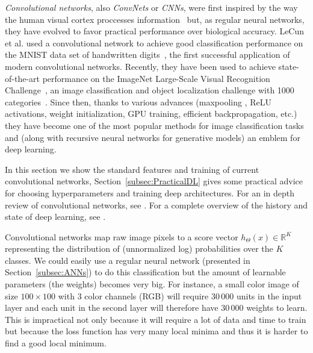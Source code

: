 \emph{Convolutional networks}, also \emph{ConvNets} or \emph{CNNs}, were first inspired by the way the human visual cortex proccesses information~\cite{Fukushima1980} but, as regular neural networks, they have evolved to favor practical performance over biological accuracy. LeCun et al. used a convolutional network to achieve good classification performance on the MNIST data set of handwritten digits~\cite{LeCun1989, LeCun1998}, the first successful application of modern convolutional networks. Recently, they have been used to achieve state-of-the-art performance on the ImageNet Large-Scale Visual Recognition Challenge~\cite{Krizhevsky2012}, an image classification and object localization challenge with 1000 categories~\cite{Russakovsky2014}. Since then, thanks to various advances (maxpooling , ReLU activations, weight initialization, GPU training, efficient backpropagation, etc.) they have become one of the most popular methods for image classification tasks and (along with recursive neural networks for generative models) an emblem for deep learning.

In this section we show the standard features and training of current convolutional networks, Section~\ref{subsec:PracticalDL} gives some practical advice for choosing hyperparameters and training deep architectures. For an in depth review of convolutional networks, see \cite{Karpathy2015}. For a complete overview of the history and state of deep learning, see \cite{Schmidhuber2015}.

Convolutional networks map raw image pixels to a score vector $h_\Theta(x) \in \mathbb{R}^K$ representing the distribution of (unnormalized log) probabilities over the $K$ classes. We could easily use a regular neural network (presented in Section~\ref{subsec:ANNs}) to do this classification but the amount of learnable parameters (the weights) becomes very big. For instance, a small color image of size $100\times100$ with 3 color channels (RGB) will require $30\,000$ units in the input layer and each unit in the second layer will therefore have $30\,000$ weights to learn. This is impractical not only because it will require a lot of data and time to train but because the loss function has very many local minima and thus it is harder to find a good local minimum.

